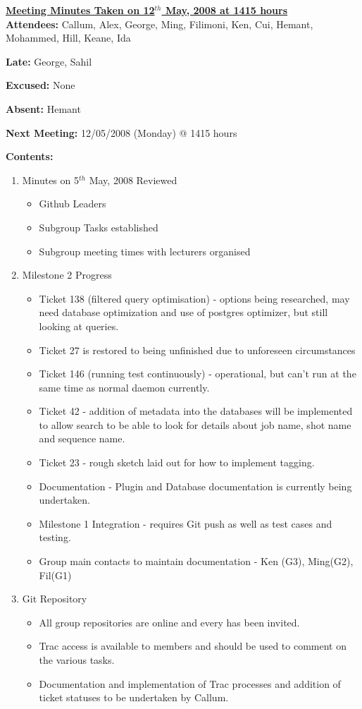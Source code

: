 \documentclass{letter}
\begin{document}
{\large \textbf{\underline{Meeting Minutes Taken on 12$^{th}$ May, 2008 at 1415 hours}}}\\

\textbf{Attendees:} Callum, Alex, George, Ming, Filimoni, Ken, Cui, Hemant, Mohammed, Hill, Keane, Ida 

\textbf{Late:} George, Sahil

\textbf{Excused:} None

\textbf{Absent:} Hemant

\textbf{Next Meeting:} 12/05/2008 (Monday) @ 1415 hours

\textbf{Contents:}

\begin{enumerate}
\item Minutes on 5$^{th}$ May, 2008 Reviewed
	\begin{itemize}
	\item Github Leaders
	\item Subgroup Tasks established
	\item Subgroup meeting times with lecturers organised
	\end{itemize}
\item Milestone 2 Progress 
	\begin{itemize}
	\item Ticket 138 (filtered query optimisation) - options being researched, may need database optimization and use of postgres optimizer, but still looking at queries.
	\item Ticket 27 is restored to being unfinished due to unforeseen circumstances
	\item Ticket 146 (running test continuously) - operational, but can't run at the same time as normal daemon currently.
	\item Ticket 42 - addition of metadata into the databases will be implemented to allow search to be able to look for details about job name, shot name and sequence name. 
	\item Ticket 23 - rough sketch laid out for how to implement tagging.
	\item Documentation - Plugin and Database documentation is currently being undertaken.
	\item Milestone 1 Integration - requires Git push as well as test cases and testing.
	\item Group main contacts to maintain documentation - Ken (G3), Ming(G2), Fil(G1)
	\end{itemize}
\item Git Repository
	\begin{itemize}
	\item All group repositories are online and every has been invited.
	\item Trac access is available to members and should be used to comment on the various tasks.
	\item Documentation and implementation of Trac processes and addition of ticket statuses to be undertaken by Callum.
	\end{itemize}
\end{enumerate} 
\end{document}
